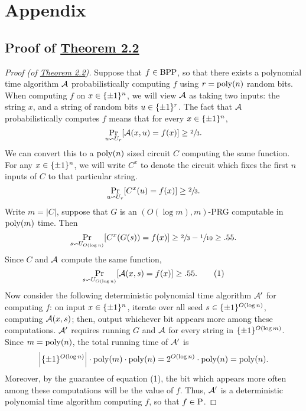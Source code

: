 \documentclass[11pt]{article}
\begin{document}



\section*{Appendix}

\subsection*{Proof of \hyperref[t-2-2]{Theorem 2.2}}

\begin{proof}[Proof \textup{(of \hyperref[t-2-2]{Theorem 2.2})}] 
    Suppose that $f \in \BPP$, so that there exists a polynomial time algorithm $\cA$ probabilistically computing $f$ using $r = \poly(n)$ random bits. When computing $f$ on $x \in \pmon$, we will view $\cA$ as taking two inputs: the string $x$, and a string of random bits $u \in \pmo^{r}$. The fact that $\cA$ probabilistically computes $f$ means that for every $x \in \pmon$, 
    \begin{equation*}
        \Pr_{u \backsim U_r}[\cA(x, u) = f(x)] \geq \sfrac{2}{3}. 
    \end{equation*}
    We can convert this to a $\poly(n)$ sized circuit $C$ computing the same function. For any $x \in \pmon$, we will write $C^x$ to denote the circuit which fixes the first $n$ inputs of $C$ to that particular string.
    \begin{equation*}
        \Pr_{u \backsim U_r}[C^{x}(u) = f(x)] \geq \sfrac{2}{3}. 
    \end{equation*}
    Write $m = |C|$, suppose that $G$ is an $(O(\log m), m)$-PRG computable in $\poly(m)$ time. Then 
    \begin{equation*}
        \Pr_{s \backsim U_{O(\log n)}}[C^{x}(G(s)) = f(x)] \geq \sfrac{2}{3} - \sfrac{1}{10} \geq .55.
    \end{equation*}
    Since $C$ and $\cA$ compute the same function, 
    \begin{equation*}
        \Pr_{s \backsim U_{O(\log n)}}[\cA(x, s) = f(x)] \geq  .55. \tag{1}
    \end{equation*}
    Now consider the following deterministic polynomial time algorithm $\cA'$ for computing $f$: on input $x \in \pmon$, iterate over all seed $s \in \pmo^{O(\log n)}$, computing $\cA(x, s)$; then, output whichever bit appears more among these computations. $\cA'$ requires running $G$ and $\cA$ for every string in $\pmo^{O(\log m)}$. Since $m = \poly(n)$, the total running time of $\cA'$ is 
    \begin{equation*}
        \left|\pmo^{O(\log n)}\right| \cdot \poly(m) \cdot \poly(n) = 2^{O(\log n)} \cdot \poly(n) = \poly(n).
    \end{equation*}
    Moreover, by the guarantee of equation (1), the bit which appears more often among these computations will be the value of $f$. Thus, $\cA'$ is a deterministic polynomial time algorithm computing $f$, so that $f \in \P$.
\end{proof}
\end{document}

